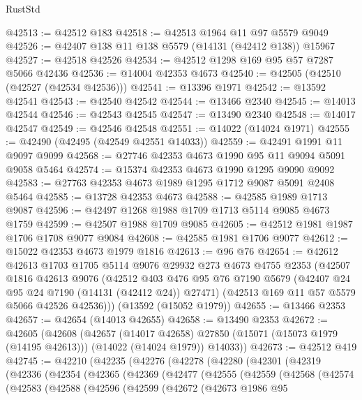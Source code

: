 \begin{lexlean}{RustStd}
\begin{coremodule}
@42513 := @42512 @183
@42518 := @42513 @1964 @11 @97 @5579 @9049
@42526 := @42407 @138 @11 @138 @5579 (@14131 (@42412 @138)) @15967
@42527 := @42518 @42526
@42534 := @42512 @1298 @169 @95 @57 @7287 @5066 @42436
@42536 := @14004 @42353 @4673
@42540 := @42505 (@42510 (@42527 (@42534 @42536)))
@42541 := @13396 @1971
@42542 := @13592 @42541
@42543 := @42540 @42542
@42544 := @13466 @2340
@42545 := @14013 @42544
@42546 := @42543 @42545
@42547 := @13490 @2340
@42548 := @14017 @42547
@42549 := @42546 @42548
@42551 := @14022 (@14024 @1971)
@42555 := @42490 (@42495 (@42549 @42551 @14033))
@42559 := @42491 @1991 @11 @9097 @9099
@42568 := @27746 @42353 @4673 @1990 @95 @11 @9094 @5091 @9058 @5464
@42574 := @15374 @42353 @4673 @1990 @1295 @9090 @9092
@42583 := @27763 @42353 @4673 @1989 @1295 @1712 @9087 @5091 @2408 @5464
@42585 := @13728 @42353 @4673
@42588 := @42585 @1989 @1713 @9087
@42596 := @42497 @1268 @1988 @1709 @1713 @5114 @9085 @4673 @1759
@42599 := @42507 @1988 @1709 @9085
@42605 := @42512 @1981 @1987 @1706 @1708 @9077 @9084
@42608 := @42585 @1981 @1706 @9077
@42612 := @15022 @42353 @4673 @1979 @1816
@42613 := @96 @76
@42654 := @42612
    @42613
    @1703
    @1705
    @5114
    @9076
    @29932
    @273
    @4673
    @4755
    @2353
    (@42507
      @1816
      @42613
      @9076
      (@42512
        @403
        @476
        @95
        @76
        @7190
        @5679
        (@42407 @24 @95 @24 @7190 (@14131 (@42412 @24)) @27471)
        (@42513 @169 @11 @57 @5579 @5066 @42526 @42536)))
    (@13592 (@15052 @1979))
@42655 := @13466 @2353
@42657 := @42654 (@14013 @42655)
@42658 := @13490 @2353
@42672 := @42605
    (@42608
      (@42657
        (@14017 @42658)
        @27850
        (@15071 (@15073 @1979 (@14195 @42613)))
        (@14022 (@14024 @1979))
        @14033))
@42673 := @42512 @419
@42745 := @42210
    (@42235
      (@42276
        (@42278
          (@42280
            (@42301
              (@42319
                (@42336
                  (@42354
                    (@42365
                      (@42369
                        (@42477
                          (@42555
                            (@42559
                              (@42568
                                (@42574
                                  (@42583
                                    (@42588
                                      (@42596
                                        (@42599
                                          (@42672
                                            (@42673
                                              @1986
                                              @95

\end{coremodule}
\end{lexlean}
